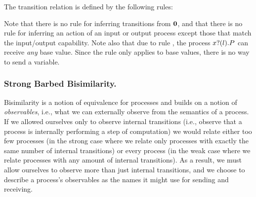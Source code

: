 The transition relation is defined by the following rules:
Note that there is no rule for inferring transitions from \( \bm{0} \), and that there is no rule for inferring an action of an input or output process except those that match the input/output capability.
Note also that due to rule , the process \( x ? (l) . P \) can receive \emph{any} base value.
Since the rule  only applies to base values, there is no way to send a variable.


\subsubsection{Strong Barbed Bisimilarity.}
Bisimilarity is a notion of equivalence for processes and
builds on a notion of \emph{observables}, i.e., what we can externally
observe from the semantics of a process. If we allowed ourselves only to observe
internal transitions (i.e., observe that a process is internally
performing a step of computation) we would relate either too few
processes (in the strong case where we relate only processes with
exactly the same number of internal transitions) or every process (in
the weak case where we relate processes with any amount of internal
transitions).  As a result, we must allow ourselves to observe more than
just internal transitions, and we choose to describe a process's observables
as the names it might use for sending and receiving.

